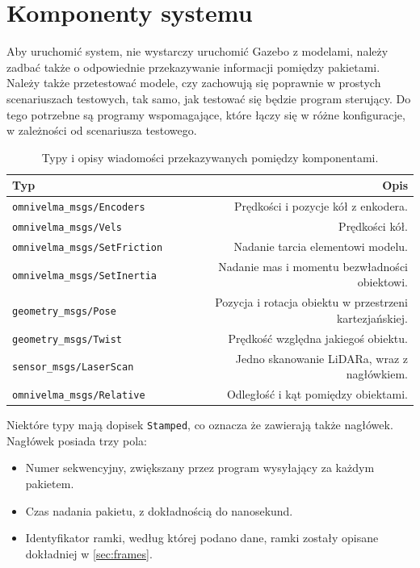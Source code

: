 \chapter{Komponenty systemu}
	Aby uruchomić system, nie wystarczy uruchomić Gazebo z modelami, należy zadbać także o odpowiednie przekazywanie informacji pomiędzy pakietami.
	Należy także przetestować modele, czy zachowują się poprawnie w prostych scenariuszach testowych, tak samo, jak testować się będzie program sterujący.
	Do tego potrzebne są programy wspomagające, które łączy się w różne konfiguracje, w zależności od scenariusza testowego.
	
	\begin{table}
		\centering
		\begin{tabular}{l r}
			Typ & Opis \\
			\hline
			\texttt{omnivelma\_msgs/Encoders} & Prędkości i pozycje kół z enkodera. \\
			\texttt{omnivelma\_msgs/Vels} & Prędkości kół. \\
			\texttt{omnivelma\_msgs/SetFriction} & Nadanie tarcia elementowi modelu. \\
			\texttt{omnivelma\_msgs/SetInertia} & Nadanie mas i momentu bezwładności obiektowi. \\
			\texttt{geometry\_msgs/Pose} & Pozycja i rotacja obiektu w przestrzeni kartezjańskiej. \\
			\texttt{geometry\_msgs/Twist} & Prędkość względna jakiegoś obiektu. \\
			\texttt{sensor\_msgs/LaserScan} & Jedno skanowanie LiDARa, wraz z nagłówkiem. \\
			\texttt{omnivelma\_msgs/Relative} & Odległość i kąt pomiędzy obiektami. \\
		\end{tabular}
		\caption{Typy i opisy wiadomości przekazywanych pomiędzy komponentami.}
		\label{tab:messages}
	\end{table}
	
	Niektóre typy mają dopisek \texttt{Stamped}, co oznacza że zawierają także nagłówek.
	Nagłówek posiada trzy pola:
	\begin{itemize}
		\item Numer sekwencyjny, zwiększany przez program wysyłający za każdym pakietem.
		\item Czas nadania pakietu, z dokładnością do nanosekund.
		\item Identyfikator ramki, według której podano dane, ramki zostały opisane dokładniej w \ref{sec:frames}.
	\end{itemize}
	

